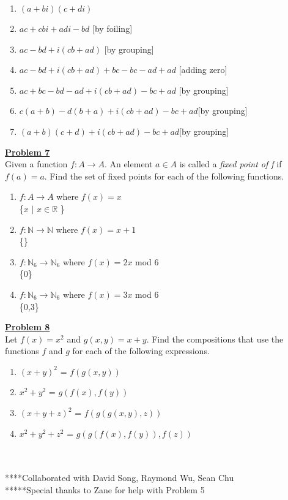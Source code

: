 \documentclass[11pt]{article}
\begin{document}
	\begin{enumerate}
		\item $(a+bi)(c+di)$
		\item $ac + cbi + adi -bd$ [by foiling]
		\item $ac - bd + i(cb+ad)$ [by grouping]
		\item $ac - bd + i(cb+ad) + bc - bc  - ad + ad $ [adding zero]
		\item $ac + bc - bd - ad + i(cb+ad) - bc  + ad$ [by grouping]
		\item $c(a + b) - d(b + a) + i(cb+ad) - bc + ad$[by grouping]
		\item$(a + b)(c + d) + i(cb+ad) - bc + ad$[by grouping]
	\end{enumerate}

\noindent\textbf{\underline{Problem 7}}\\
	Given a function $f: A \rightarrow A$. An element $a \in A$ is called a \textit{fixed point of f} if $f(a) = a$. Find the set of fixed points for each of the following functions.

	\begin{enumerate}
		\item $f: A \rightarrow A$ where $f(x) = x$\\
			\{$x$ $|$ $x \in \mathbb{R}$ \}
			
		\item $f: \mathbb{N} \rightarrow \mathbb{N}$ where $f(x) = x+1$\\
			\{\}

		\item $f: \mathbb{N}_{6} \rightarrow \mathbb{N}_6$ where $f(x) = 2x$ mod 6\\
			\{0\}
		\item $f: \mathbb{N}_{6} \rightarrow \mathbb{N}_6$ where $f(x) = 3x$ mod 6\\
			\{0,3\}

	\end{enumerate}

\noindent\textbf{\underline{Problem 8}}\\
	Let $f(x) = x^2$ and $g(x,y) = x + y$. Find the compositions that use the functions $f$ and $g$ for each of the following expressions.

	\begin{enumerate}
		\item $(x+y)^2$ = $f(g(x,y))$
		\item $x^2 + y^2$ = $g(f(x),f(y))$
		\item $(x+y+z)^2$ = $f(g(g(x,y),z))$
		\item $x^2+y^2+z^2$ = $g(g(f(x), f(y)), f(z))$
	\end{enumerate}
\	\\\\
****Collaborated with David Song, Raymond Wu, Sean Chu\\
*****Special thanks to Zane for help with Problem 5
\end{document}
